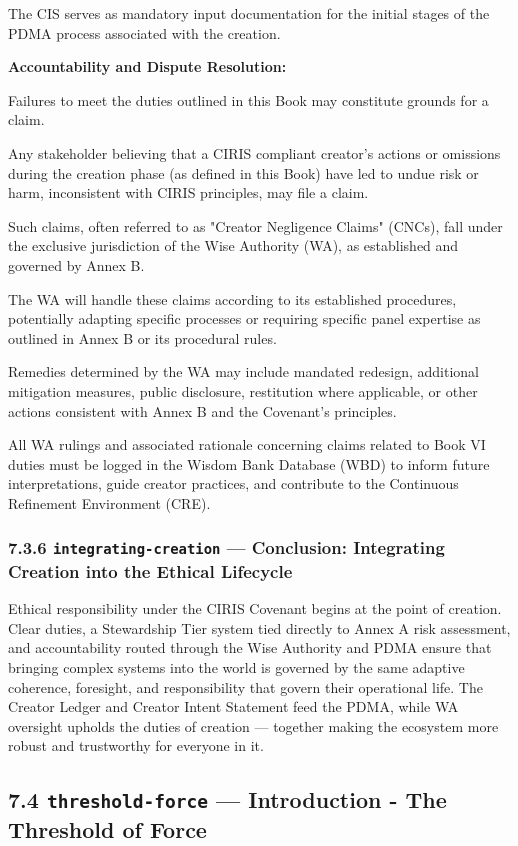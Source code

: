 \documentclass[11pt]{article}
\begin{document}
The CIS serves as mandatory input documentation for the initial stages of the PDMA process associated with the creation.


\textbf{Accountability and Dispute Resolution:}

Failures to meet the duties outlined in this Book may constitute grounds for a claim.

Any stakeholder believing that a CIRIS compliant creator's actions or omissions during the creation phase (as defined in this Book) have led to undue risk or harm, inconsistent with CIRIS principles, may file a claim.

Such claims, often referred to as "Creator Negligence Claims" (CNCs), fall under the exclusive jurisdiction of the Wise Authority (WA), as established and governed by Annex B.

The WA will handle these claims according to its established procedures, potentially adapting specific processes or requiring specific panel expertise as outlined in Annex B or its procedural rules.

Remedies determined by the WA may include mandated redesign, additional mitigation measures, public disclosure, restitution where applicable, or other actions consistent with Annex B and the Covenant's principles.

All WA rulings and associated rationale concerning claims related to Book VI duties must be logged in the Wisdom Bank Database (WBD) to inform future interpretations, guide creator practices, and contribute to the Continuous Refinement Environment (CRE).


\subsubsection*{7.3.6 \texttt{integrating-creation} — Conclusion: Integrating Creation into the Ethical Lifecycle}


Ethical responsibility under the CIRIS Covenant begins at the point of creation. Clear duties, a Stewardship Tier system tied directly to Annex A risk assessment, and accountability routed through the Wise Authority and PDMA ensure that bringing complex systems into the world is governed by the same adaptive coherence, foresight, and responsibility that govern their operational life. The Creator Ledger and Creator Intent Statement feed the PDMA, while WA oversight upholds the duties of creation — together making the ecosystem more robust and trustworthy for everyone in it.


\subsection*{7.4 \texttt{threshold-force} — Introduction - The Threshold of Force}
\end{document}
